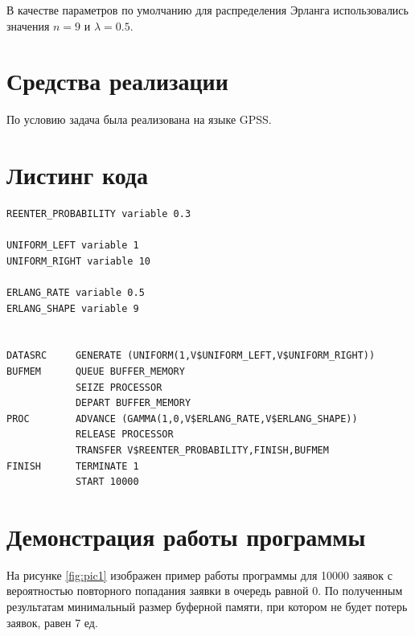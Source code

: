\documentclass[12pt]{report}
\begin{document}
В качестве параметров по умолчанию для распределения Эрланга использовались значения $n = 9$ и $\lambda = 0.5$.

\section*{Средства реализации}

По условию задача была реализована на языке GPSS.

\section*{Листинг кода}

\begin{lstlisting}
REENTER_PROBABILITY variable 0.3

UNIFORM_LEFT variable 1
UNIFORM_RIGHT variable 10

ERLANG_RATE variable 0.5
ERLANG_SHAPE variable 9


DATASRC     GENERATE (UNIFORM(1,V$UNIFORM_LEFT,V$UNIFORM_RIGHT))
BUFMEM      QUEUE BUFFER_MEMORY
            SEIZE PROCESSOR
            DEPART BUFFER_MEMORY
PROC        ADVANCE (GAMMA(1,0,V$ERLANG_RATE,V$ERLANG_SHAPE))
            RELEASE PROCESSOR
            TRANSFER V$REENTER_PROBABILITY,FINISH,BUFMEM
FINISH      TERMINATE 1
            START 10000
\end{lstlisting}

\clearpage
\section*{Демонстрация работы программы}
На рисунке \ref{fig:pic1} изображен пример работы программы для 10000 заявок с вероятностью повторного попадания заявки в очередь равной 0. По полученным результатам минимальный размер буферной памяти, при котором не будет потерь заявок, равен 7 ед.
\end{document}
